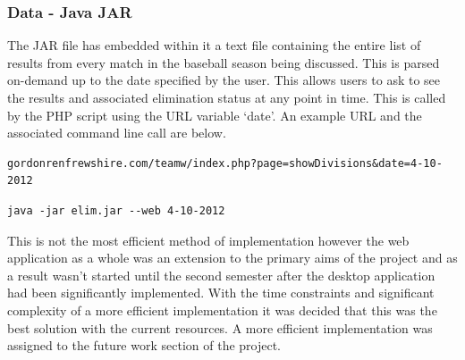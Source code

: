 \subsubsection{Data - Java JAR}

The JAR file has embedded within it a text file containing the entire list of
results from every match in the baseball season being discussed. This is parsed
on-demand up to the date specified by the user. This allows users to ask to see
the results and associated elimination status at any point in time. This is
called by the PHP script using the URL variable `date'. An example URL and
the associated command line call are below.

\begin{verbatim}
gordonrenfrewshire.com/teamw/index.php?page=showDivisions&date=4-10-2012
\end{verbatim}

\begin{verbatim}
java -jar elim.jar --web 4-10-2012
\end{verbatim}

This is not
the most efficient method of implementation however the web application as a
whole was an extension to the primary aims of the project and as a result wasn't
started until the second semester after the desktop application had been
significantly implemented. With the time constraints and significant complexity
of a more efficient implementation it was decided that this was the best
solution with the current resources. A more efficient implementation was
assigned to the future work section of the project.



